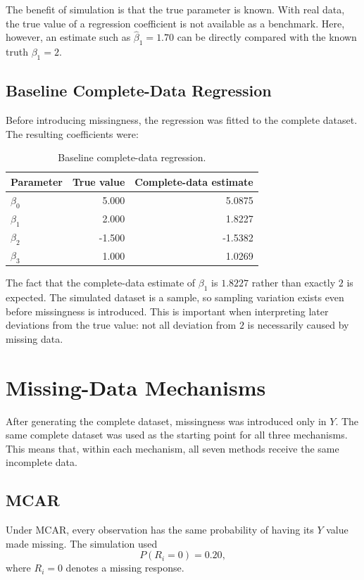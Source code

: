 \documentclass[11pt,a4paper]{article}
\begin{document}
The benefit of simulation is that the true parameter is known. With real data, the true value of a regression coefficient is not available as a benchmark. Here, however, an estimate such as $\hat\beta_1=1.70$ can be directly compared with the known truth $\beta_1=2$.

\subsection{Baseline Complete-Data Regression}
Before introducing missingness, the regression was fitted to the complete dataset. The resulting coefficients were:

\begin{table}[H]
\centering
\caption{Baseline complete-data regression.}
\begin{tabular}{lrr}
\toprule
Parameter & True value & Complete-data estimate\\
\midrule
$\beta_0$ & 5.000 & 5.0875\\
$\beta_1$ & 2.000 & 1.8227\\
$\beta_2$ & -1.500 & -1.5382\\
$\beta_3$ & 1.000 & 1.0269\\
\bottomrule
\end{tabular}
\end{table}

The fact that the complete-data estimate of $\beta_1$ is $1.8227$ rather than exactly $2$ is expected. The simulated dataset is a sample, so sampling variation exists even before missingness is introduced. This is important when interpreting later deviations from the true value: not all deviation from $2$ is necessarily caused by missing data.

\section{Missing-Data Mechanisms}
After generating the complete dataset, missingness was introduced only in $Y$. The same complete dataset was used as the starting point for all three mechanisms. This means that, within each mechanism, all seven methods receive the same incomplete data.

\subsection{MCAR}
Under MCAR, every observation has the same probability of having its $Y$ value made missing. The simulation used
\[
P(R_i=0)=0.20,
\]
where $R_i=0$ denotes a missing response.
\end{document}
